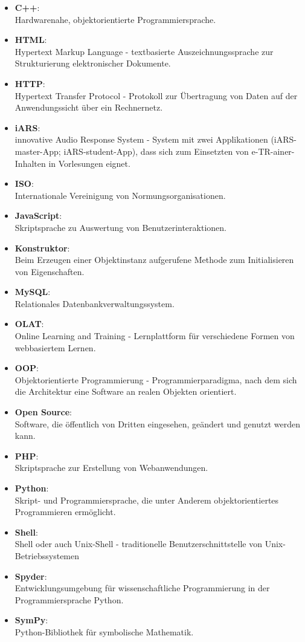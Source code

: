 \begin{itemize}
    \item \textbf{C++}:\\ Hardwarenahe, objektorientierte Programmiersprache.
	\item \textbf{HTML}:\\ Hypertext Markup Language - textbasierte Auszeichnungssprache zur Strukturierung elektronischer Dokumente.
	\item \textbf{HTTP}:\\ Hypertext Transfer Protocol - Protokoll zur Übertragung von Daten auf der Anwendungssicht über ein Rechnernetz.
	\item \textbf{iARS}:\\ innovative Audio Response System - System mit zwei Applikationen (iARS-master-App; iARS-student-App), dass sich zum Einsetzten von e-TR-ainer-Inhalten in Vorlesungen eignet.
	\item \textbf{ISO}:\\ Internationale Vereinigung von Normungsorganisationen.
	\item \textbf{JavaScript}:\\ Skriptsprache zu Auswertung von Benutzerinteraktionen.
	\item \textbf{Konstruktor}:\\ Beim Erzeugen einer Objektinstanz aufgerufene Methode zum Initialisieren von Eigenschaften.
	\item \textbf{MySQL}:\\ Relationales Datenbankverwaltungssystem.
	\item \textbf{OLAT}:\\ Online Learning and Training - Lernplattform für verschiedene Formen von webbasiertem Lernen.
	\item \textbf{OOP}:\\  Objektorientierte Programmierung - Programmierparadigma, nach dem sich die Architektur eine Software an realen Objekten orientiert.
	\item \textbf{Open Source}:\\ Software, die öffentlich von Dritten eingesehen, geändert und genutzt werden kann.
	\item \textbf{PHP}:\\ Skriptsprache zur Erstellung von Webanwendungen.
	\item \textbf{Python}:\\ Skript- und Programmiersprache, die unter Anderem objektorientiertes Programmieren ermöglicht.
	\item \textbf{Shell}:\\ Shell oder auch Unix-Shell - traditionelle Benutzerschnittstelle von Unix-Betriebssystemen
	\item \textbf{Spyder}:\\ Entwicklungsumgebung für wissenschaftliche Programmierung in der Programmiersprache Python.
	\item \textbf{SymPy}:\\ Python-Bibliothek für symbolische Mathematik.
\end{itemize} 